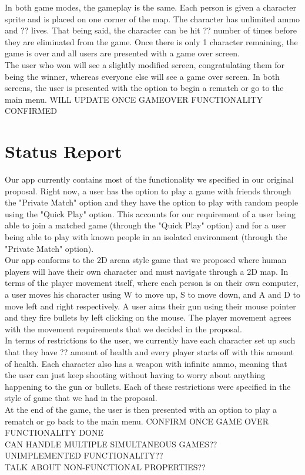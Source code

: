 \documentclass[11pt, oneside]{article}   	%
\begin{document}
In both game modes, the gameplay is the same. Each person is given a character sprite
and is placed on one corner of the map. The character has unlimited ammo and ?? lives.
That being said, the character can be hit ?? number of times before they are eliminated
from the game. Once there is only 1 character remaining, the game is over and all users
are presented with a game over screen.\\

The user who won will see a slightly modified screen, congratulating them for being
the winner, whereas everyone else will see a game over screen. In both screens,
the user is presented with the option to begin a rematch or go to the main menu.
WILL UPDATE ONCE GAMEOVER FUNCTIONALITY CONFIRMED


\section{Status Report}
\hspace*{5mm}
Our app currently contains most of the functionality we specified in our original
proposal. Right now, a user has the option to play a game with friends through the
"Private Match" option and they have the option to play with random people using
the "Quick Play" option. This accounts for our requirement of a user being able to
join a matched game (through the "Quick Play" option) and for a user being able to play
with known people in an isolated environment (through the "Private Match" option).\\

Our app conforms to the 2D arena style game that we proposed where human players will
have their own character and must navigate through a 2D map. In terms of the player
movement itself, where each person is on their own computer, a user moves his character
using W to move up, S to move down, and A and D to move left and right respectively.
A user aims their gun using their mouse pointer and they fire bullets by left clicking
on the mouse. The player movement agrees with the movement requirements that we decided
in the proposal.\\

In terms of restrictions
to the user, we currently have each character set up such that they have ?? amount of
health and every player starts off with this amount of health. Each character also
has a weapon with infinite ammo, meaning that the user can just keep shooting without
having to worry about anything happening to the gun or bullets. Each of these restrictions
were specified in the style of game that we had in the proposal.\\

At the end of the game, the user is then presented with an option to play a rematch or
go back to the main menu.
CONFIRM ONCE GAME OVER FUNCTIONALITY DONE\\

CAN HANDLE MULTIPLE SIMULTANEOUS GAMES??\\

UNIMPLEMENTED FUNCTIONALITY??\\
TALK ABOUT NON-FUNCTIONAL PROPERTIES??\\
\end{document}
